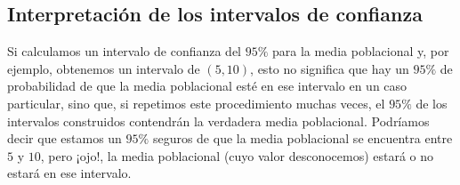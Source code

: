 \documentclass[
  letterpaper,
  DIV=11,
  numbers=noendperiod]{scrreprt}
\begin{document}
\hypertarget{interpretaciuxf3n-de-los-intervalos-de-confianza}{%
\subsection{Interpretación de los intervalos de
confianza}\label{interpretaciuxf3n-de-los-intervalos-de-confianza}}

Si calculamos un intervalo de confianza del \(95\%\) para la media
poblacional y, por ejemplo, obtenemos un intervalo de \((5, 10)\), esto
no significa que hay un \(95\%\) de probabilidad de que la media
poblacional esté en ese intervalo en un caso particular, sino que, si
repetimos este procedimiento muchas veces, el \(95\%\) de los intervalos
construidos contendrán la verdadera media poblacional. Podríamos decir
que estamos un \(95\%\) seguros de que la media poblacional se encuentra
entre \(5\) y \(10\), pero ¡ojo!, la media poblacional (cuyo valor
desconocemos) estará o no estará en ese intervalo.
\end{document}
